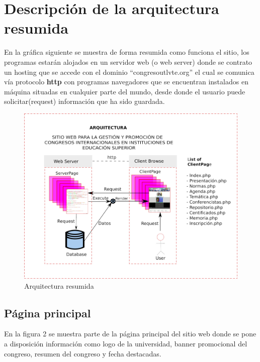 \documentclass[a4paper,14px]{article}
\begin{document}
\section{Descripción de la arquitectura resumida}
\label{sec:descripcion-de-la}


En la gráfica siguiente se muestra de forma resumida como funciona el sitio, los programas estarán alojados en un servidor web (o web server) donde se contrato un hosting que se accede con el  dominio ``congresoutlvte.org'' el cual se comunica vía protocolo \textbf{http} con programas navegadores que se encuentran instalados en máquina situadas en cualquier parte del mundo, desde donde el usuario puede solicitar(request) información  que ha sido guardada. \\


\begin{figure}[H]
  \centering
  \includegraphics[scale=0.3]{congresoweb.jpg}
  \caption{Arquitectura resumida}
  \label{fig:arquitectura}
\end{figure}


\newpage
\subsection{Página principal}
\label{sec:pagina-principal}

En la figura 2 se muestra parte de la página principal del sitio web donde se pone a disposición información como logo de la universidad, banner promocional del congreso, resumen del congreso y fecha destacadas.
\end{document}
